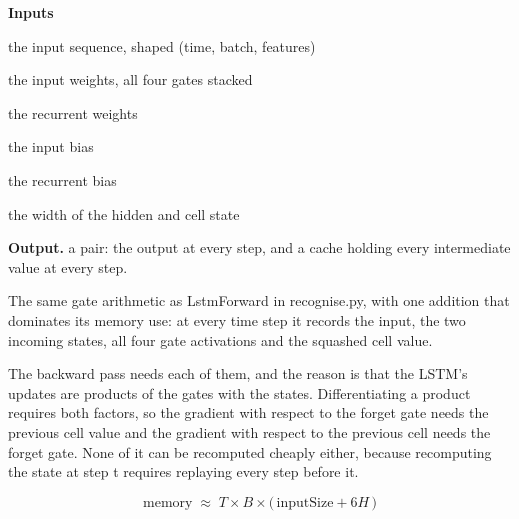 \noindent\textbf{Inputs}
\begin{description}[leftmargin=2.2em,style=nextline,font=\normalfont\ttfamily]\setlength\itemsep{1pt}
  \item[{x}] \normalfont the input sequence, shaped (time, batch, features)
  \item[{weightIh}] \normalfont the input weights, all four gates stacked
  \item[{weightHh}] \normalfont the recurrent weights
  \item[{biasIh}] \normalfont the input bias
  \item[{biasHh}] \normalfont the recurrent bias
  \item[{hiddenSize}] \normalfont the width of the hidden and cell state
\end{description}

\noindent\textbf{Output.} a pair: the output at every step, and a cache holding every intermediate value at every step.


The same gate arithmetic as LstmForward in recognise.py, with one addition that dominates its memory use: at every time step it records the input, the two incoming states, all four gate activations and the squashed cell value.


The backward pass needs each of them, and the reason is that the LSTM's updates are products of the gates with the states. Differentiating a product requires both factors, so the gradient with respect to the forget gate needs the previous cell value and the gradient with respect to the previous cell needs the forget gate. None of it can be recomputed cheaply either, because recomputing the state at step t requires replaying every step before it.


\begin{equation}
\mathrm{memory} \;\approx\; T \times B \times \big(\,\mathrm{inputSize} + 6H\,\big)
\end{equation}

